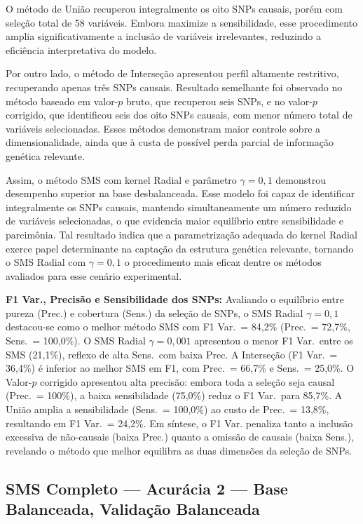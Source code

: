 \documentclass[12pt,a4paper]{article}
\newcommand{\novo}[1]{\textcolor{corNova}{#1}}
\begin{document}
O método de União recuperou integralmente os oito SNPs causais, porém com seleção total de 58 variáveis. Embora maximize a sensibilidade, esse procedimento amplia significativamente a inclusão de variáveis irrelevantes, reduzindo a eficiência interpretativa do modelo.

Por outro lado, o método de Interseção apresentou perfil altamente restritivo, recuperando apenas três SNPs causais. Resultado semelhante foi observado no método baseado em valor-$p$ bruto, que recuperou seis SNPs, e no valor-$p$ corrigido, que identificou seis dos oito SNPs causais, com menor número total de variáveis selecionadas. Esses métodos demonstram maior controle sobre a dimensionalidade, ainda que à custa de possível perda parcial de informação genética relevante.

Assim, o método SMS com kernel Radial e parâmetro $\gamma = 0{,}1$ demonstrou desempenho superior na base desbalanceada. Esse modelo foi capaz de identificar integralmente os SNPs causais, mantendo simultaneamente um número reduzido de variáveis selecionadas, o que evidencia maior equilíbrio entre sensibilidade e parcimônia. Tal resultado indica que a parametrização adequada do kernel Radial exerce papel determinante na captação da estrutura genética relevante, tornando o SMS Radial com $\gamma = 0{,}1$ o procedimento mais eficaz dentre os métodos avaliados para esse cenário experimental.


\novo{\textbf{F1 Var., Precisão e Sensibilidade dos SNPs:} Avaliando o equilíbrio entre pureza (Prec.) e cobertura (Sens.) da seleção de SNPs, o SMS Radial $\gamma=0{,}1$ destacou-se como o melhor método SMS com F1 Var.\ = 84,2\% (Prec.\ = 72,7\%, Sens.\ = 100,0\%). O SMS Radial $\gamma=0{,}001$ apresentou o menor F1 Var.\ entre os SMS (21,1\%), reflexo de alta Sens.\ com baixa Prec. A Interseção (F1 Var.\ = 36,4\%) é inferior ao melhor SMS em F1, com Prec.\ = 66,7\% e Sens.\ = 25,0\%. O Valor-$p$ corrigido apresentou alta precisão: embora toda a seleção seja causal (Prec.\ = 100\%), a baixa sensibilidade (75,0\%) reduz o F1 Var.\ para 85,7\%. A União amplia a sensibilidade (Sens.\ = 100,0\%) ao custo de Prec.\ = 13,8\%, resultando em F1 Var.\ = 24,2\%. Em síntese, o F1 Var. penaliza tanto a inclusão excessiva de não-causais (baixa Prec.) quanto a omissão de causais (baixa Sens.), revelando o método que melhor equilibra as duas dimensões da seleção de SNPs.}
\subsection{SMS Completo --- Acurácia 2 --- Base Balanceada, Validação Balanceada}
\end{document}
